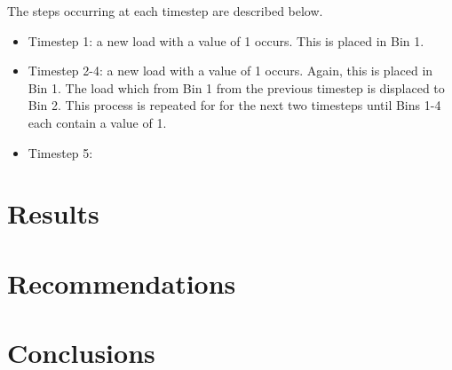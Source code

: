 \documentclass[review,12pt]{elsarticle}
\begin{document}
The steps occurring at each timestep are described below.

\begin{itemize}
    \item Timestep 1: a new load with a value of 1 occurs. This is placed in Bin 1.
    \item Timestep 2-4: a new load with a value of 1 occurs. Again, this is placed in Bin 1. The load which from Bin 1 from the previous timestep is displaced to Bin 2. This process is repeated for for the next two timesteps until Bins 1-4 each contain a value of 1.
    \item Timestep 5:  
\end{itemize}

\section*{Results}

\section*{Recommendations}

\section*{Conclusions}


\end{document}

